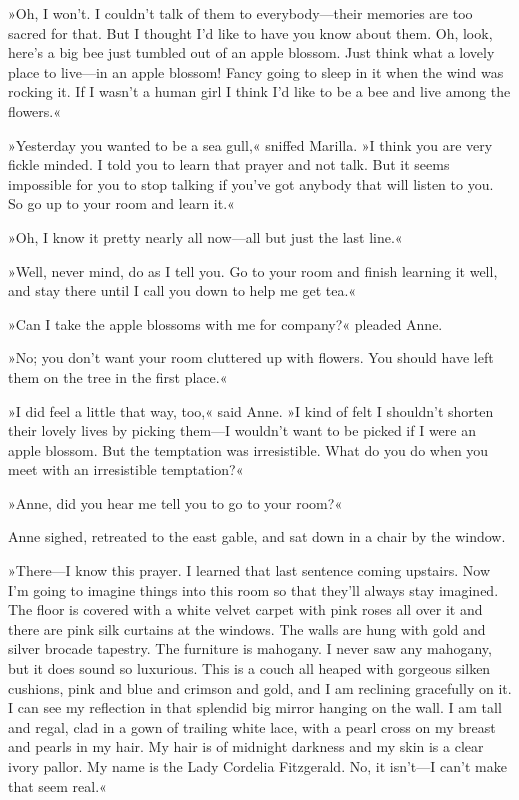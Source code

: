 »Oh, I won’t. I couldn’t talk of them to everybody—their memories are too sacred for that. But I thought I’d like to have you know about them. Oh, look, here’s a big bee just tumbled out of an apple blossom. Just think what a lovely place to live—in an apple blossom! Fancy going to sleep in it when the wind was rocking it. If I wasn’t a human girl I think I’d like to be a bee and live among the flowers.«

»Yesterday you wanted to be a sea gull,« sniffed Marilla. »I think you are very fickle minded. I told you to learn that prayer and not talk. But it seems impossible for you to stop talking if you’ve got anybody that will listen to you. So go up to your room and learn it.«

»Oh, I know it pretty nearly all now—all but just the last line.«

»Well, never mind, do as I tell you. Go to your room and finish learning it well, and stay there until I call you down to help me get tea.«

»Can I take the apple blossoms with me for company?« pleaded Anne.

»No; you don’t want your room cluttered up with flowers. You should have left them on the tree in the first place.«

»I did feel a little that way, too,« said Anne. »I kind of felt I shouldn’t shorten their lovely lives by picking them—I wouldn’t want to be picked if I were an apple blossom. But the temptation was irresistible. What do you do when you meet with an irresistible temptation?«

»Anne, did you hear me tell you to go to your room?«

Anne sighed, retreated to the east gable, and sat down in a chair by the window.

»There—I know this prayer. I learned that last sentence coming upstairs. Now I’m going to imagine things into this room so that they’ll always stay imagined. The floor is covered with a white velvet carpet with pink roses all over it and there are pink silk curtains at the windows. The walls are hung with gold and silver brocade tapestry. The furniture is mahogany. I never saw any mahogany, but it does sound so luxurious. This is a couch all heaped with gorgeous silken cushions, pink and blue and crimson and gold, and I am reclining gracefully on it. I can see my reflection in that splendid big mirror hanging on the wall. I am tall and regal, clad in a gown of trailing white lace, with a pearl cross on my breast and pearls in my hair. My hair is of midnight darkness and my skin is a clear ivory pallor. My name is the Lady Cordelia Fitzgerald. No, it isn’t—I can’t make that seem real.«

